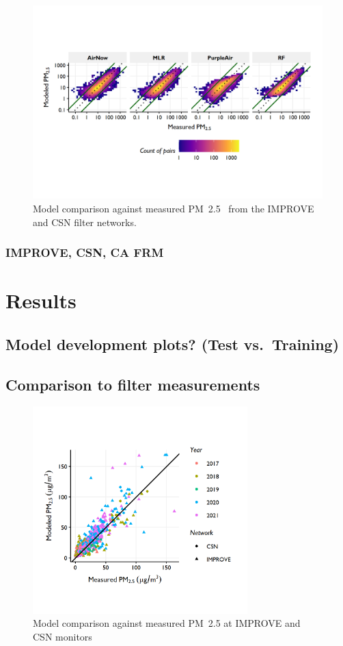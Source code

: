 \documentclass[gmd, manuscript]{copernicus}
\begin{document}
\begin{figure}
\includegraphics[width=12cm]{./Figures/MethodComparisonGMD} \caption{Model comparison against measured PM~2.5~ from the IMPROVE and CSN filter networks.}\label{fig:unnamed-chunk-2}
\end{figure}

\subsubsection{IMPROVE, CSN, CA FRM}

\section{Results}

\subsection{Model development plots? (Test vs.~Training)}

\subsection{Comparison to filter measurements}

\begin{figure}
\includegraphics[width=8.3cm]{./Figures/Model_vs_Filters_FiveEpisodesGMD} \caption{Model comparison against measured PM~2.5 at IMPROVE and CSN monitors}\label{fig:unnamed-chunk-3}
\end{figure}
\end{document}
